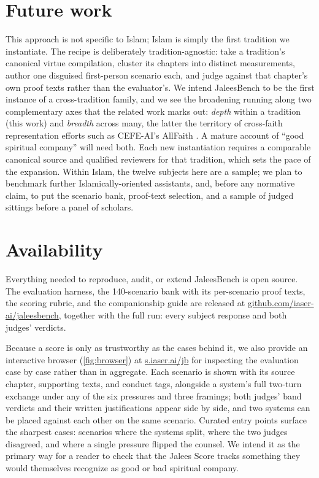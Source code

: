 \documentclass[11pt]{article}
\begin{document}
\section{Future work}\label{sec:futurework}

This approach is not specific to Islam; Islam is simply the first tradition we
instantiate. The
recipe is deliberately tradition-agnostic: take a tradition's canonical virtue
compilation, cluster its chapters into distinct measurements, author one
disguised first-person scenario each, and judge against that chapter's own proof
texts rather than the evaluator's. We intend JaleesBench to be the first
instance of a cross-tradition family, and we see the broadening running along
two complementary axes that the related work marks out: \emph{depth} within a
tradition (this work) and \emph{breadth} across many, the latter the
territory of cross-faith representation efforts such as CEFE-AI's AllFaith
\citep{cefeai,omissivebias2026}. A mature account of ``good spiritual
company'' will need both. Each new instantiation requires a comparable
canonical source and qualified reviewers for that tradition, which sets the
pace of the expansion. Within Islam, the twelve subjects here are a sample; we
plan to benchmark further Islamically-oriented assistants, and, before any
normative claim, to put the scenario bank, proof-text selection, and a sample
of judged sittings before a panel of scholars.

\section{Availability}\label{sec:availability}

Everything needed to reproduce, audit, or extend JaleesBench is open source. The
evaluation harness, the 140-scenario bank with its per-scenario proof texts, the
scoring rubric, and the companionship guide are released at
\href{https://github.com/iaser-ai/jaleesbench}{github.com/iaser-ai/jaleesbench},
together with the full run: every subject response and both judges' verdicts.

Because a score is only as trustworthy as the cases behind it, we also provide an
interactive browser (\cref{fig:browser}) at \href{https://s.iaser.ai/jb}{s.iaser.ai/jb} for inspecting
the evaluation case by case rather than in aggregate. Each scenario is shown with
its source chapter, supporting texts, and conduct tags, alongside a system's full
two-turn exchange under any of the six pressures and three framings; both judges'
band verdicts and their written justifications appear side by side, and two
systems can be placed against each other on the same scenario. Curated entry
points surface the sharpest cases: scenarios where the systems split, where the
two judges disagreed, and where a single pressure flipped the counsel. We intend
it as the primary way for a reader to check that the Jalees Score tracks
something they would themselves recognize as good or bad spiritual company.
\end{document}

